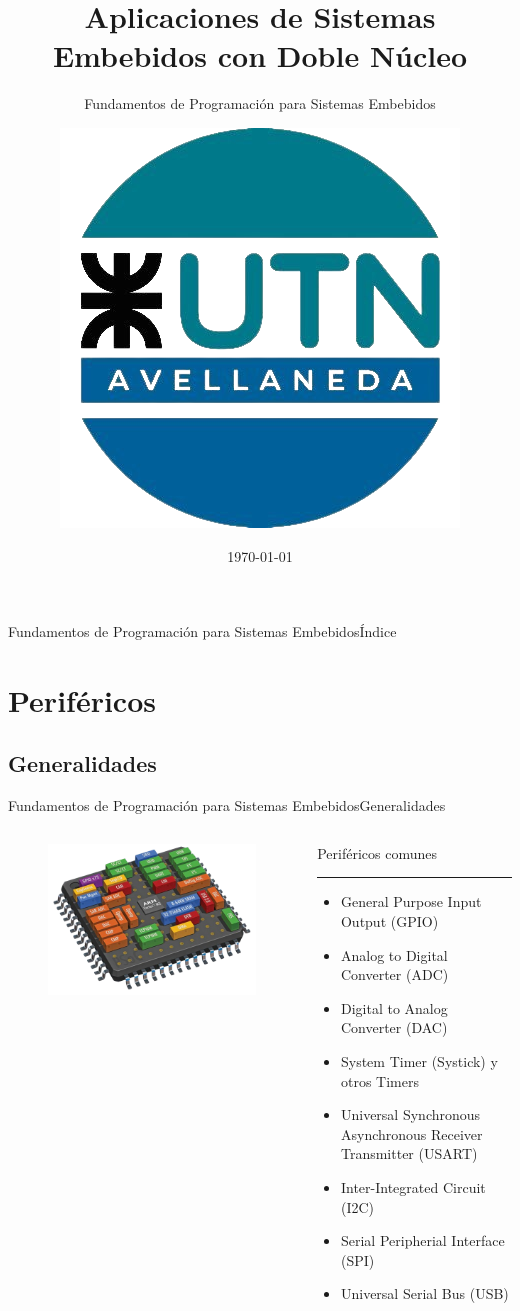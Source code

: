 \documentclass[aspectratio=169, xcolor=dvipsnames]{beamer}
\title{Aplicaciones de Sistemas Embebidos con Doble Núcleo}
\subtitle{Fundamentos de Programación para Sistemas Embebidos}
\author[Fabrizio Carlassara - Laboratorio de Sistemas Embebidos]{\includegraphics[scale=0.15]{resources/images/utn_logo.png}}
\institute{UTN FRA\\Departamento de Ingeniería Electrónica\\Laboratorio de Sistemas Embebidos}
\date[]{\today}
\begin{document}
\frame{\titlepage}
\begin{frame}{Fundamentos de Programación para Sistemas Embebidos}{Índice}
\begin{multicols}{2}
\tableofcontents
\end{multicols}
\end{frame}

\section{Periféricos}
\subsection{Generalidades}
\begin{frame}{Fundamentos de Programación para Sistemas Embebidos}{Generalidades}
\begin{columns}
    \begin{column}{0.5\textwidth}
    \begin{figure}
    \centering
    \includegraphics[width=1\linewidth]{resources/images/peripherals.png}
    \end{figure}
    \end{column}
    \begin{column}{0.5\textwidth}
    Periféricos comunes
    \noindent\rule{\textwidth}{0.5pt}
    \begin{itemize}
        \item General Purpose Input Output (GPIO)
        \item Analog to Digital Converter (ADC)
        \item Digital to Analog Converter (DAC)
        \item System Timer (Systick) y otros Timers
        \item Universal Synchronous Asynchronous Receiver Transmitter (USART)
        \item Inter-Integrated Circuit (I2C)
        \item Serial Peripherial Interface (SPI)
        \item Universal Serial Bus (USB)
    \end{itemize}
    \end{column}
\end{columns}
\end{frame}
\end{document}
